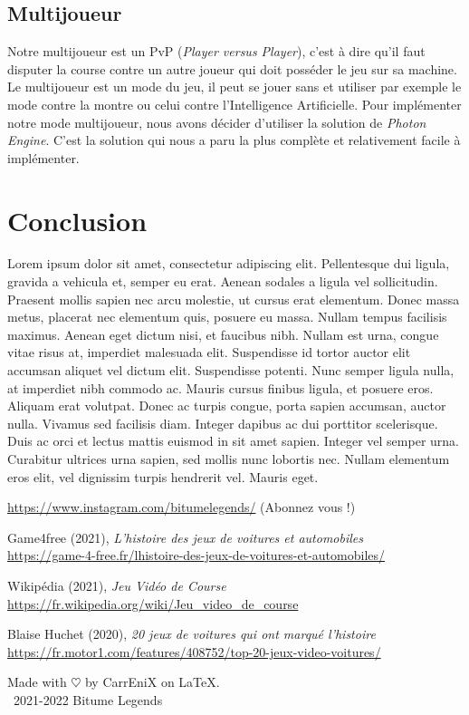 \documentclass[11pt,a4paper]{article}
\begin{document}
  \subsection{Multijoueur}
    Notre multijoueur est un PvP (\textit{Player versus Player}), c'est à dire qu'il faut disputer la course 
    contre un autre joueur qui doit posséder le jeu sur sa machine. Le multijoueur est un mode du jeu, il peut 
    se jouer sans et utiliser par exemple le mode contre la montre ou celui contre l'Intelligence Artificielle.
    Pour implémenter notre mode multijoueur, nous avons décider d'utiliser la solution de \emph{Photon Engine}.
    C'est la solution qui nous a paru la plus complète et relativement facile à implémenter.
\clearpage

\section{Conclusion}
  Lorem ipsum dolor sit amet, consectetur adipiscing elit. Pellentesque dui ligula, gravida a vehicula et, semper eu erat. Aenean sodales a ligula vel sollicitudin. Praesent mollis sapien nec arcu molestie, ut cursus erat elementum. Donec massa metus, placerat nec elementum quis, posuere eu massa. Nullam tempus facilisis maximus. Aenean eget dictum nisi, et faucibus nibh. Nullam est urna, congue vitae risus at, imperdiet malesuada elit. Suspendisse id tortor auctor elit accumsan aliquet vel dictum elit. Suspendisse potenti. Nunc semper ligula nulla, at imperdiet nibh commodo ac. Mauris cursus finibus ligula, et posuere eros.
  Aliquam erat volutpat. Donec ac turpis congue, porta sapien accumsan, auctor nulla. Vivamus sed facilisis diam. Integer dapibus ac dui porttitor scelerisque. Duis ac orci et lectus mattis euismod in sit amet sapien. Integer vel semper urna. Curabitur ultrices urna sapien, sed mollis nunc lobortis nec. Nullam elementum eros elit, vel dignissim turpis hendrerit vel. Mauris eget.
\clearpage

\begin{thebibliography}{9}
    \url{https://www.instagram.com/bitumelegends/} (Abonnez vous !)
  
    Game4free (2021), \emph{L'histoire des jeux de voitures et automobiles}\\
    \url{https://game-4-free.fr/lhistoire-des-jeux-de-voitures-et-automobiles/}

    Wikipédia (2021), \emph{Jeu Vidéo de Course} \\
    \url{https://fr.wikipedia.org/wiki/Jeu_video_de_course}

    Blaise Huchet (2020), \emph{20 jeux de voitures qui ont marqué l'histoire}\\
    \url{https://fr.motor1.com/features/408752/top-20-jeux-video-voitures/}

\end{thebibliography}

Made with $\heartsuit$ by CarrEniX on \LaTeX.\\
\textcopyright\, 2021-2022 Bitume Legends
\end{document}
